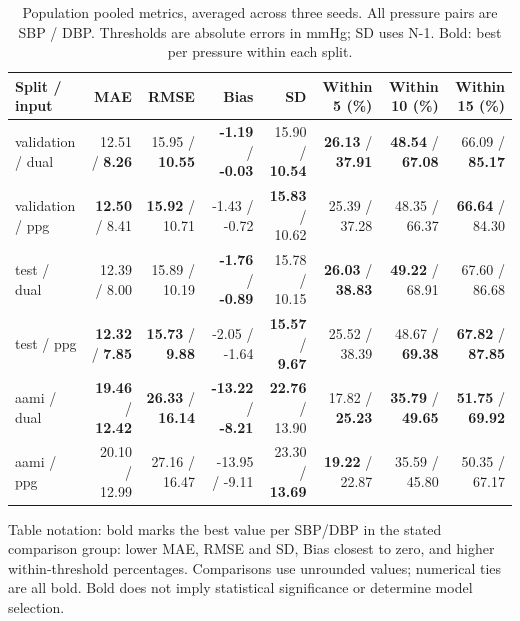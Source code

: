 \begin{table}[t]
\centering\caption{Population pooled metrics, averaged across three seeds. All pressure pairs are SBP / DBP. Thresholds are absolute errors in mmHg; SD uses N-1. Bold: best per pressure within each split.}\label{tab:population}
\footnotesize
\setlength{\tabcolsep}{4pt}
\begin{tabular}{lrrrrrrr}\toprule
Split / input & MAE & RMSE & Bias & SD & Within 5 (\%) & Within 10 (\%) & Within 15 (\%)\\\midrule
validation / dual & 12.51 / \textbf{8.26} & 15.95 / \textbf{10.55} & \textbf{-1.19} / \textbf{-0.03} & 15.90 / \textbf{10.54} & \textbf{26.13} / \textbf{37.91} & \textbf{48.54} / \textbf{67.08} & 66.09 / \textbf{85.17}\\
validation / ppg & \textbf{12.50} / 8.41 & \textbf{15.92} / 10.71 & -1.43 / -0.72 & \textbf{15.83} / 10.62 & 25.39 / 37.28 & 48.35 / 66.37 & \textbf{66.64} / 84.30\\
test / dual & 12.39 / 8.00 & 15.89 / 10.19 & \textbf{-1.76} / \textbf{-0.89} & 15.78 / 10.15 & \textbf{26.03} / \textbf{38.83} & \textbf{49.22} / 68.91 & 67.60 / 86.68\\
test / ppg & \textbf{12.32} / \textbf{7.85} & \textbf{15.73} / \textbf{9.88} & -2.05 / -1.64 & \textbf{15.57} / \textbf{9.67} & 25.52 / 38.39 & 48.67 / \textbf{69.38} & \textbf{67.82} / \textbf{87.85}\\
aami / dual & \textbf{19.46} / \textbf{12.42} & \textbf{26.33} / \textbf{16.14} & \textbf{-13.22} / \textbf{-8.21} & \textbf{22.76} / 13.90 & 17.82 / \textbf{25.23} & \textbf{35.79} / \textbf{49.65} & \textbf{51.75} / \textbf{69.92}\\
aami / ppg & 20.10 / 12.99 & 27.16 / 16.47 & -13.95 / -9.11 & 23.30 / \textbf{13.69} & \textbf{19.22} / 22.87 & 35.59 / 45.80 & 50.35 / 67.17\\
\bottomrule\end{tabular}
\par\smallskip\begin{minipage}{\textwidth}\footnotesize Table notation: bold marks the best value per SBP/DBP in the stated comparison group: lower MAE, RMSE and SD, Bias closest to zero, and higher within-threshold percentages. Comparisons use unrounded values; numerical ties are all bold. Bold does not imply statistical significance or determine model selection.\end{minipage}
\end{table}
